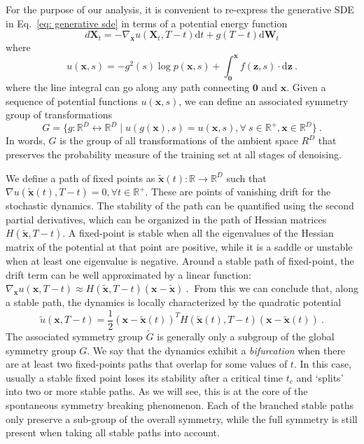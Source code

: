 \documentclass{article}
\newcommand{\vect}[1]{\boldsymbol{#1}}
\begin{document}
For the purpose of our analysis, it is convenient to re-express the generative SDE in Eq.~\ref{eq: generative sde} in terms of a potential energy function
\begin{equation}
d \mathbf{X}_t = -\nabla_{\vect{x}} u(\mathbf{X}_t, T- t)\text{d}t  + g(T-t)\text{d}\mathbf{W}_t
\end{equation}
where
\begin{equation}
u(\vect{x}, s) =  -g^2(s) \log  p(\vect{x}, s)  + \int_{\vect{0}}^{\vect{x}} f(\vect{z}, s) \cdot \text{d}\vect{z}~.
\end{equation}
where the line integral can go along any path connecting 
 $\vect{0}$ and $\vect{x}$. Given a sequence of potential functions $u(\vect{x}, s)$,  we can define an associated symmetry group of transformations
\begin{equation}
    G = \{g: \mathbb{R}^D \leftrightarrow \mathbb{R}^D \mid  u(g(\vect{x}), s) = u(\vect{x}, s) , \forall ~s \in \mathbb{R}^+, \vect{x} \in \mathbb{R}^D \}~.
\end{equation}
In words, $G$ is the group of all transformations of the ambient space $R^D$ that preserves the probability measure of the training set at all stages of denoising.

We define a path of fixed points as $\tilde{\vect{x}}(t): \mathbb{R} \rightarrow \mathbb{R}^D$ such that $\nabla u(\tilde{\vect{x}}(t), T - t) = 0, \forall t \in \mathbb{R}^+$. These are points of vanishing drift for the stochastic dynamics. The stability of the path can be quantified using the second partial derivatives, which can be organized in the path of Hessian matrices $H(\tilde{\vect{x}}, T - t)$. A fixed-point is stable when all the eigenvalues of the Hessian matrix of the potential at that point are positive, while it is a saddle or unstable when at least one eigenvalue is negative. Around a stable path of fixed-point, the drift term can be well approximated by a linear function:
$
    \nabla_{\vect{x}} u(\vect{x}, T- t) \approx H(\tilde{\vect{x}}, T - t) (\vect{x} - \tilde{\vect{x}})~.~
$
From this we can conclude that, along a stable path, the dynamics is locally characterized by the quadratic potential 
\begin{equation}
    \tilde{u}(\vect{x}, T - t) = \frac{1}{2} (\vect{x} - \tilde{\vect{x}}(t))^T H(\tilde{\vect{x}}(t), T - t) (\vect{x} - \tilde{\vect{x}}(t))~.
\end{equation}
The associated symmetry group $\tilde{G}$ is generally only a subgroup of the global symmetry group $G$. We say that the dynamics exhibit a \emph{bifurcation} when there are at least two fixed-points paths that overlap for some values of $t$. In this case, usually a stable fixed point loses its stability after a critical time $t_c$ and `splits' into two or more stable paths. As we will see, this is at the core of the spontaneous symmetry breaking phenomenon. Each of the branched stable paths only preserve a sub-group of the overall symmetry, while the full symmetry is still present when taking all stable paths into account.
\end{document}
